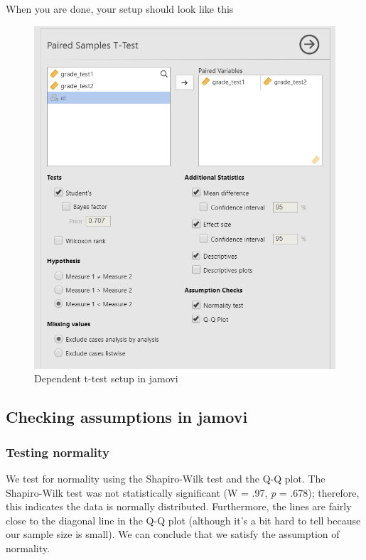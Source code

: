 \documentclass[
]{book}
\begin{document}
When you are done, your setup should look like this

\begin{figure}

{\centering \includegraphics[width=0.8\linewidth]{images/03_dependent_t-test/dependent_setup} 

}

\caption{Dependent t-test setup in jamovi}\label{fig:unnamed-chunk-1}
\end{figure}

\hypertarget{checking-assumptions-in-jamovi-1}{%
\subsection{Checking assumptions in jamovi}\label{checking-assumptions-in-jamovi-1}}

\hypertarget{testing-normality-1}{%
\subsubsection{Testing normality}\label{testing-normality-1}}

We test for normality using the Shapiro-Wilk test and the Q-Q plot. The Shapiro-Wilk test was not statistically significant (W = .97, \emph{p} = .678); therefore, this indicates the data is normally distributed. Furthermore, the lines are fairly close to the diagonal line in the Q-Q plot (although it's a bit hard to tell because our sample size is small). We can conclude that we satisfy the assumption of normality.
\end{document}
